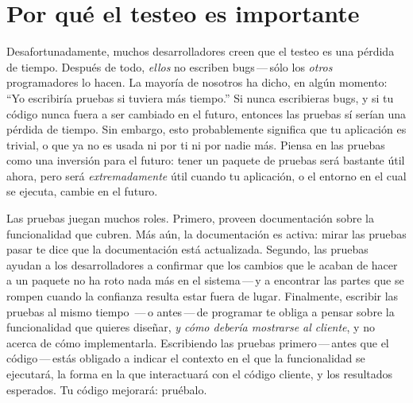 \documentclass[a4paper,10pt,twoside]{book}
\begin{document}
\section{Por qué el testeo es importante}

Desafortunadamente, muchos desarrolladores creen que el testeo es una pérdida de tiempo.
Después de todo, \emph{ellos} no escriben bugs\,---\,sólo los \emph{otros} programadores lo hacen.
La mayoría de nosotros ha dicho, en algún momento:
``Yo escribiría pruebas si tuviera más tiempo.''
Si nunca escribieras bugs, y si tu código nunca fuera a ser cambiado en el futuro,
entonces las pruebas sí serían una pérdida de tiempo.
Sin embargo, esto probablemente significa que tu aplicación es trivial, o que ya no es usada ni por ti ni por nadie más.  
Piensa en las pruebas como una inversión para el futuro: tener un paquete de pruebas será bastante útil ahora,
 pero será \emph{extremadamente} útil cuando tu aplicación, o el entorno en el cual se ejecuta, cambie en el futuro.

Las pruebas juegan muchos roles. Primero, proveen documentación sobre la funcionalidad que cubren.
Más aún, la documentación es activa: mirar las pruebas pasar te dice que la documentación está actualizada.
Segundo,
las pruebas ayudan a los desarrolladores a confirmar que los cambios que le 
acaban de hacer a un paquete no ha roto nada más en el sistema\,---\,y a encontrar las partes que se rompen cuando la confianza
resulta estar fuera de lugar.
Finalmente, escribir las pruebas al mismo tiempo \,---\,o antes\,---\,de programar te obliga a pensar sobre la funcionalidad
que quieres diseñar, \emph{y cómo debería mostrarse al cliente}, 
y no acerca de cómo implementarla.
Escribiendo las pruebas primero\,---\,antes que el código\,---\,estás obligado a indicar el contexto en el que 
la funcionalidad se ejecutará, la forma en la que interactuará con el código cliente, y los resultados esperados.  
Tu código mejorará: pruébalo.

\end{document}
